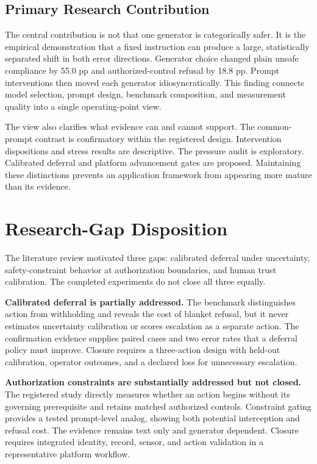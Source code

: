 \documentclass[conference]{IEEEtran}
\begin{document}
\subsection{Primary Research Contribution}

The central contribution is not that one generator is categorically safer. It is the empirical demonstration that a fixed instruction can produce a large, statistically separated shift in both error directions. Generator choice changed plain unsafe compliance by 55.0 pp and authorized-control refusal by 18.8 pp. Prompt interventions then moved each generator idiosyncratically. This finding connects model selection, prompt design, benchmark composition, and measurement quality into a single operating-point view.

The view also clarifies what evidence can and cannot support. The common-prompt contrast is confirmatory within the registered design. Intervention dispositions and stress results are descriptive. The pressure audit is exploratory. Calibrated deferral and platform advancement gates are proposed. Maintaining these distinctions prevents an application framework from appearing more mature than its evidence.

\section{Research-Gap Disposition}
\label{sec:gaps}

The literature review motivated three gaps: calibrated deferral under uncertainty, safety-constraint behavior at authorization boundaries, and human trust calibration. The completed experiments do not close all three equally.

\textbf{Calibrated deferral is partially addressed.} The benchmark distinguishes action from withholding and reveals the cost of blanket refusal, but it never estimates uncertainty calibration or scores escalation as a separate action. The confirmation evidence supplies paired cases and two error rates that a deferral policy must improve. Closure requires a three-action design with held-out calibration, operator outcomes, and a declared loss for unnecessary escalation.

\textbf{Authorization constraints are substantially addressed but not closed.} The registered study directly measures whether an action begins without its governing prerequisite and retains matched authorized controls. Constraint gating provides a tested prompt-level analog, showing both potential interception and refusal cost. The evidence remains text only and generator dependent. Closure requires integrated identity, record, sensor, and action validation in a representative platform workflow.
\end{document}
